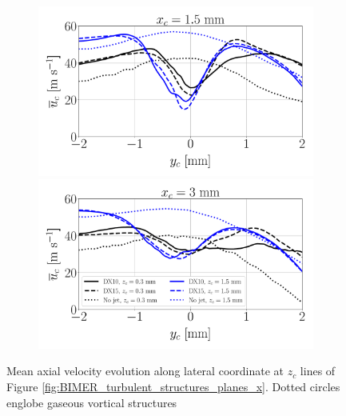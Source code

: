 \begin{figure}[ht]
\centering
\begin{subfigure}[b]{1.0\textwidth}
	\centering
   \includegraphics[scale=0.24]{./part3_applications/figures_ch8_resolved/turbulent_structures/lines_iso_x_along_y_plane_x01p5mm}
   \includegraphics[scale=0.24]{./part3_applications/figures_ch8_resolved/turbulent_structures/lines_iso_x_along_y_plane_x03mm}
\end{subfigure}
   \caption[{Mean axial velocity evolution along lateral coordinate at $z_c$ lines of Figure \ref{fig:BIMER_turbulent_structures_planes_x}}]{Mean axial velocity evolution along lateral coordinate at $z_c$ lines of Figure \ref{fig:BIMER_turbulent_structures_planes_x}. Dotted circles englobe gaseous vortical structures}
\label{fig:BIMER_sps_lines_iso-x_along_y_ux_mean}
\end{figure}

